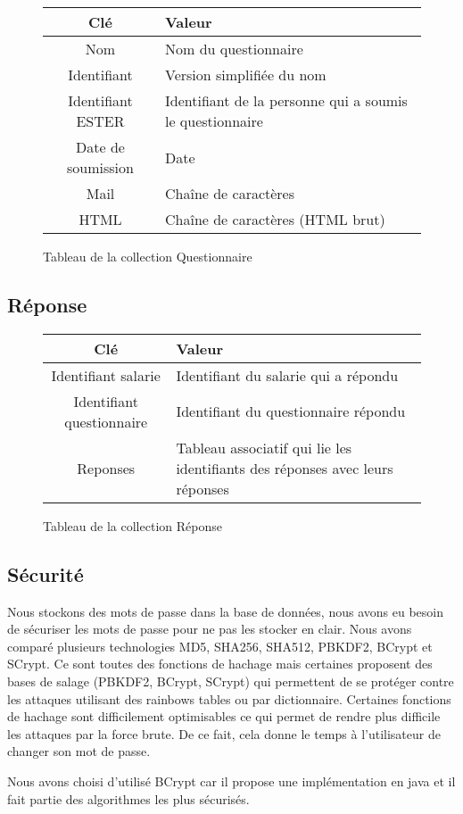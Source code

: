 \begin{figure}[H]
    \begin{center}
        \begin{tabularx}{17cm}{|c|X|}
            \hline
            Clé & Valeur  \tabularnewline 
            \hline
            Nom & 
            Nom du questionnaire \tabularnewline 
            Identifiant & 
            Version simplifiée du nom \tabularnewline
            Identifiant ESTER & 
            Identifiant de la personne qui a soumis le questionnaire \tabularnewline
            Date de soumission & 
            Date \tabularnewline
            Mail & 
            Chaîne de caractères \tabularnewline
            HTML & 
            Chaîne de caractères (HTML brut) \tabularnewline
            \hline
        \end{tabularx}
    \end{center}
    \caption{Tableau de la collection Questionnaire}
\end{figure}

\subsection{Réponse}

\begin{figure}[H]
    \begin{center}
        \begin{tabularx}{17cm}{|c|X|}
            \hline
            Clé & Valeur  \tabularnewline 
            \hline
            Identifiant salarie & 
            Identifiant du salarie qui a répondu \tabularnewline
            Identifiant questionnaire & 
            Identifiant du questionnaire répondu \tabularnewline
            Reponses & 
            Tableau associatif qui lie les identifiants des réponses 
            avec leurs réponses \tabularnewline
            \hline
        \end{tabularx}
    \end{center}
    \caption{Tableau de la collection Réponse}
\end{figure}
\subsection{Sécurité}

Nous stockons des mots de passe dans la base de données, nous avons eu besoin de sécuriser les mots de passe pour ne pas les stocker en clair.
Nous avons comparé plusieurs technologies MD5, SHA256, SHA512, PBKDF2, BCrypt et SCrypt. Ce sont toutes des fonctions de hachage mais certaines proposent des bases de salage (PBKDF2, BCrypt, SCrypt) qui permettent de se protéger contre les attaques utilisant des rainbows tables ou par dictionnaire. 
Certaines fonctions de hachage sont difficilement optimisables ce qui permet de rendre plus difficile les attaques par la force brute. De ce fait, cela donne le temps à l'utilisateur de changer son mot de passe.     

Nous avons choisi d'utilisé BCrypt car il propose une implémentation en java et il fait partie des algorithmes les plus sécurisés.